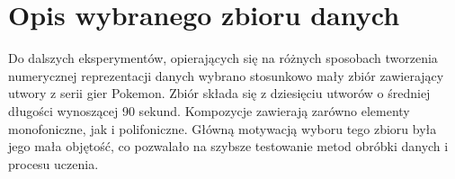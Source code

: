 {    \section{Opis wybranego zbioru danych}
    {
        Do dalszych eksperymentów, opierających się na różnych sposobach tworzenia numerycznej reprezentacji
        danych wybrano stosunkowo mały zbiór zawierający utwory z serii gier Pokemon.
        Zbiór składa się z dziesięciu utworów o średniej długości wynoszącej 90 sekund. Kompozycje zawierają zarówno 
        elementy monofoniczne, jak i polifoniczne. Główną motywacją wyboru tego zbioru była jego mała objętość,
        co pozwalało na szybsze testowanie metod obróbki danych i procesu uczenia.
    }
}